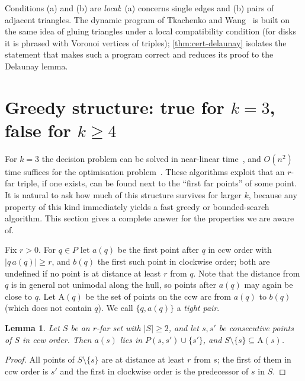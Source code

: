 \documentclass[11pt,a4paper]{article}
\newtheorem{lemma}[theorem]{Lemma}
\theoremstyle{definition}
\theoremstyle{remark}
\newcommand{\Arc}{\mathrm{A}}
\begin{document}
Conditions (a) and (b) are \emph{local}: (a) concerns single edges and (b)
pairs of adjacent triangles. The dynamic program of
Tkachenko and Wang~\cite{tw26} is built on the same idea of gluing triangles
under a local compatibility condition (for disks it is phrased with
Voronoi vertices of triples); \cref{thm:cert-delaunay} isolates the
statement that makes such a program correct and reduces its proof to the
Delaunay lemma.

\section{Greedy structure: true for \texorpdfstring{$k=3$}{k=3}, false for \texorpdfstring{$k\ge4$}{k>=4}}\label{sec:greedy}

For $k=3$ the decision problem can be solved in near-linear
time~\cite{tw25}, and $O(n^2)$ time suffices for the optimisation
problem~\cite{kobayashi}. These algorithms exploit that an $r$-far triple, if
one exists, can be found next to the ``first far points'' of some point. It is
natural to ask how much of this structure survives for larger $k$, because any
property of this kind immediately yields a fast greedy or bounded-search
algorithm. This section gives a complete answer for the properties we are
aware of.

Fix $r>0$. For $q\in P$ let $a(q)$ be the first point after $q$ in ccw order
with $|q\,a(q)|\ge r$, and $b(q)$ the first such point in clockwise order;
both are undefined if no point is at distance at least $r$ from $q$. Note that
the distance from $q$ is in general not unimodal along the hull, so points
after $a(q)$ may again be close to $q$. Let $\Arc(q)$ be the set of points on
the ccw arc from $a(q)$ to $b(q)$ (which does not contain $q$). We call
$\{q,a(q)\}$ a \emph{tight pair}.

\begin{lemma}\label{lem:arcbasic}
Let $S$ be an $r$-far set with $|S|\ge2$, and let $s,s'$ be consecutive points
of $S$ in ccw order. Then $a(s)$ lies in $P(s,s')\cup\{s'\}$, and
$S\setminus\{s\}\subseteq\Arc(s)$.
\end{lemma}
\begin{proof}
All points of $S\setminus\{s\}$ are at distance at least $r$ from $s$; the first
of them in ccw order is $s'$ and the first in clockwise order is the
predecessor of $s$ in $S$.
\end{proof}
\end{document}
